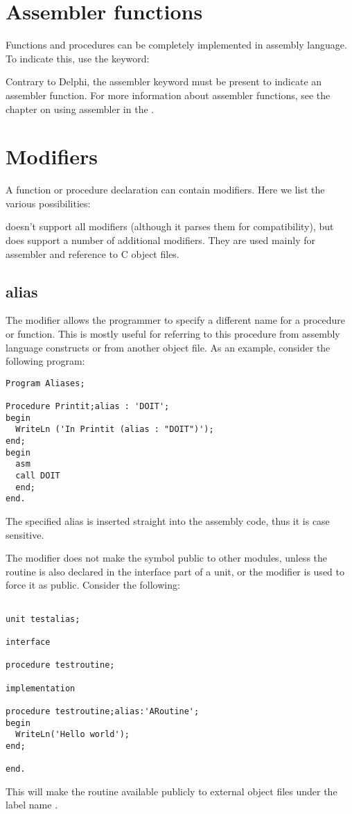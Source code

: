 \section{Assembler functions}
Functions and procedures can be completely implemented in assembly
language. To indicate this, use the  keyword:

Contrary to Delphi, the assembler keyword must be present to indicate an
assembler function.
For more information about assembler functions, see the chapter on using
assembler in the \progref.


\section{Modifiers}
A function or procedure declaration can contain modifiers. Here we list the
various possibilities:

\fpc doesn't support all \tp modifiers (although it parses them for
compatibility), but does support a number of additional modifiers. 
They are used mainly for assembler and reference to C object files.

\subsection{alias}
\label{se:alias}
The  modifier allows the programmer to specify a different name for a
procedure or function. This is mostly useful for referring to this procedure
from assembly language constructs or from another object file. As an example,
consider the following program:
\begin{verbatim}
Program Aliases;

Procedure Printit;alias : 'DOIT';
begin
  WriteLn ('In Printit (alias : "DOIT")');
end;
begin
  asm
  call DOIT
  end;
end.
\end{verbatim}
\begin{remark} The specified alias is inserted straight into the assembly
code, thus it is case sensitive.
\end{remark}
The  modifier does not make the symbol public to other modules,
unless the routine is also declared in the interface part of a unit, or
the  modifier is used to force it as public. Consider the
following:
\begin{verbatim}

unit testalias;

interface

procedure testroutine;

implementation

procedure testroutine;alias:'ARoutine';
begin
  WriteLn('Hello world');
end;

end.
\end{verbatim}
This will make the routine  available publicly to
external object files under the label name .

